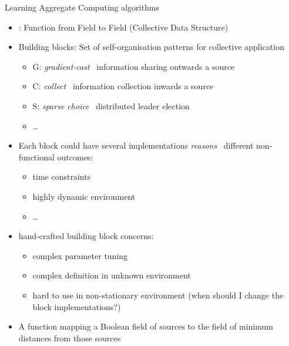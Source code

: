 \documentclass[8pt, aspectratio=169, handout]{beamer}
\begin{document}
\begin{frame}[allowframebreaks]{Learning Aggregate Computing algorithms}
  \begin{cardTiny}
    \begin{itemize}
      \item {}: Function from Field to Field (Collective Data Structure)
      \item Building blocks: Set of self-organisation patterns for collective application ~\cite{beal2015aggregate-programming}
      \begin{itemize}
        \item G: \emph{gradient-cast} \faArrowRight \,  information sharing outwards a source
        \item C: \emph{collect} \faArrowRight \, information collection inwards a source
        \item S: \emph{sparse choice} \faArrowRight \, distributed leader election
        \item \dots
      \end{itemize}
      \item Each block could have several implementations \emph{reasons} \faArrowRight \, different non-functional
      outcomes:
      \begin{itemize}
        \item time constraints
        \item highly dynamic environment
        \item \dots
      \end{itemize}
      \item[\failure{\faThumbsDown}] hand-crafted building block concerns:
      \begin{itemize}
        \item complex parameter tuning
        \item complex definition in unknown environment
        \item hard to use in non-stationary environment (when should I change the block implementations?)
      \end{itemize}
    \end{itemize}
  \end{cardTiny}
  \begin{card}
    \begin{itemize}
      \item A function mapping a Boolean field of sources to the field of minimum distances from those sources

\end{itemize}
\end{card}
\end{frame}
\end{document}
